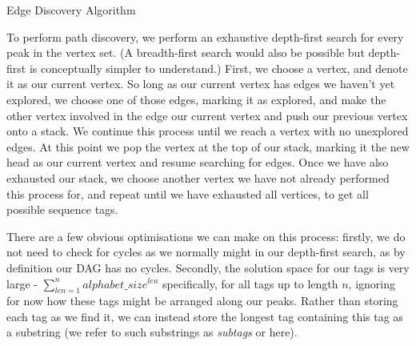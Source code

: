 \documentclass{l4proj}
\begin{document}
\begin{algorithm}
    \DontPrintSemicolon

\caption{Edge Discovery Algorithm}\label{alg:edgedisc}
\end{algorithm}

To perform path discovery, we perform an exhaustive depth-first search for every peak in the vertex set. (A breadth-first search would also be possible but depth-first is conceptually simpler to understand.) First, we choose a vertex, and denote it as our current vertex. So long as our current vertex has edges we haven't yet explored, we choose one of those edges, marking it as explored, and make the other vertex involved in the edge our current vertex and push our previous vertex onto a stack. We continue this process until we reach a vertex with no unexplored edges. At this point we pop the vertex at the top of our stack, marking it the new head as our current vertex and resume searching for edges. Once we have also exhausted our stack, we choose another vertex we have not already performed this process for, and repeat until we have exhausted all vertices, to get all possible sequence tags.

There are a few obvious optimisations we can make on this process: firstly, we do not need to check for cycles as we normally might in our depth-first search, as by definition our DAG has no cycles. Secondly, the solution space for our tags is very large - \(\sum_{len=1}^{n}{alphabet\_size^{len}}\) specifically, for all tags up to length \(n\), ignoring for now how these tags might be arranged along our peaks. Rather than storing each tag as we find it, we can instead store the longest tag containing this tag as a substring (we refer to such substrings as \textit{subtags} or here). 
\end{document}
